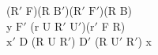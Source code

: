 ($\text{R}'$ F)(R $\text{B}'$)($\text{R}'$ $\text{F}'$)(R B)\\
y $\text{F}'$ (r U $\text{R}'$ $\text{U}'$)($\text{r}'$ F R)\\
$\text{x}'$ D (R U $\text{R}'$) $\text{D}'$ (R $\text{U}'$ $\text{R}'$) x\\
